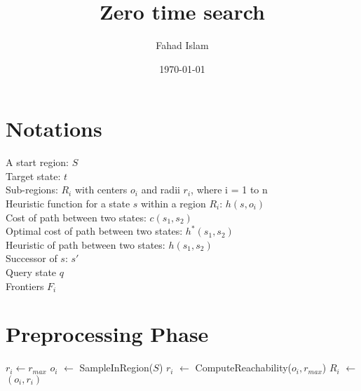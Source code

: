 \documentclass[a4paper]{article}
\title{Zero time search}
\author{Fahad Islam}
\date{\today}
\begin{document}
\maketitle

\section{Notations}
A start region: $S$\\
Target state: $t$\\
Sub-regions: $R_i$ with centers $o_i$ and radii $r_i$, where i = 1 to n\\
Heuristic function for a state $s$ within a region $R_i$: $h(s, o_i)$\\
Cost of path between two states: $c(s_1, s_2)$\\
Optimal cost of path between two states: $h^*(s_1, s_2)$\\
Heuristic of path between two states: $h(s_1, s_2)$\\
Successor of $s$: $s'$\\
Query state $q$\\
Frontiers $F_i$

\section{Preprocessing Phase}

\begin{algorithm}
\caption{}\label{alg:1}
\begin{algorithmic}[1]
\State $r_i \leftarrow r_{max}$
	\State $o_i$ $\leftarrow$ SampleInRegion($S$)
    \State $r_i$ $\leftarrow$ ComputeReachability($o_i, r_{max}$)
    \State $R_i$ $\leftarrow$ $(o_i, r_i)$
\EndProcedure
\end{algorithmic}
\end{algorithm}
\end{document}
